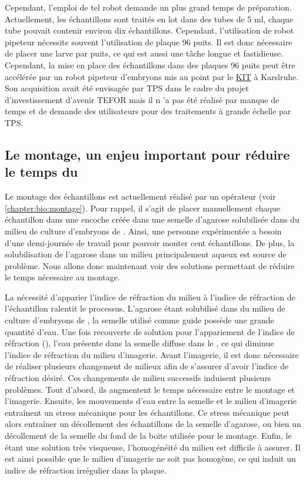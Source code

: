\documentclass[\main/main.tex]{subfiles}
\begin{document}
%
Cependant, l'emploi de tel robot demande un plus grand temps de préparation.
%
Actuellement, les échantillons sont traités en lot dans des tubes de 5 ml,
chaque tube pouvait contenir environ dix échantillons.
%
Cependant, l'utilisation de robot pipeteur nécessite souvent l'utilisation de plaque 96 puits.
%
Il est donc nécessaire de placer une larve par puits,
ce qui est aussi une tâche longue et fastidieuse.
%
Cependant, la mise en place des échantillons dans des plaques 96 puits peut être accélérée par un robot pipeteur d'embryons mis au point par le \href{https://www.ezrc.kit.edu/59.php}{KIT} à Karslruhe. Son acquisition avait été envisagée par TPS dans le cadre du projet d'investissement d'avenir TEFOR mais il n 'a pas été réalisé par manque de temps et de demande des utilisateurs pour des traitements à grande échelle par TPS.

    \subsection{Le montage, un enjeu important pour réduire le temps du \hcs{}}

%    
Le montage des échantillons est actuellement réalisé par un opérateur (voir \autoref{chapter:bio:montage}).
%
Pour rappel, il s'agit de placer manuellement chaque échantillon dans une encoche créée dans une semelle d'agarose solubilisée dans du milieu de culture d'embryons de \pzs{}.
%
Ainsi, une personne expérimentée a besoin d'une demi-journée de travail pour pouvoir monter cent échantillons.
%
De plus, la solubilisation de l'agarose dans un milieu principalement aqueux est source de problème.
%
Nous allons donc maintenant voir des solutions permettant de réduire le temps nécessaire au montage.

La nécessité d'apparier l'indice de réfraction du milieu à l'indice de réfraction de l'échantillon ralentit le processus.
%
L'agarose étant solubilisé dans du milieu de culture d'embryons de \pz{},
la semelle utilisé comme guide possède une grande quantité d'eau.
%
Une fois recouverte de solution pour l'appariement de l'indice de réfraction (\MD{}),
l'eau présente dans la semelle diffuse dans le \MD{}, ce qui diminue l'indice de réfraction du milieu d'imagerie.
%
Avant l'imagerie,
il est donc nécessaire de réaliser plusieurs changement de milieux afin de s'assurer d'avoir l'indice de réfraction désiré.
%
Ces changements de milieu successifs induisent plusieurs problèmes. Tout d'abord, ils augmentent le temps nécessaire entre le montage et l'imagerie.
%
Ensuite, les mouvements d'eau entre la semelle et le milieu d'imagerie entraînent un stress mécanique pour les échantillons.
%
Ce stress mécanique peut alors entraîner un décollement des échantillons de la semelle d'agarose,
ou bien un décollement de la semelle du fond de la boite utilisée pour le montage.
%
Enfin, le \MD{} étant une solution très visqueuse,  l'homogénéité du milieu est difficile à assurer.
%
Il est ainsi possible que le milieu d'imagerie ne soit pas homogène, ce qui induit un indice de réfraction irrégulier dans la plaque.
\end{document}
